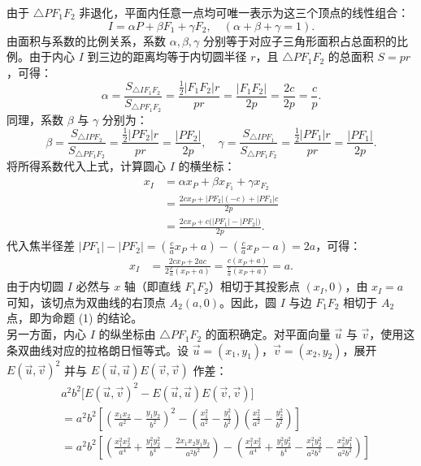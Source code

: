 \begin{solution}
由于 $\triangle PF_1F_2$ 非退化，平面内任意一点均可唯一表示为这三个顶点的线性组合：
\[ I = \alpha P + \beta F_1 + \gamma F_2, \quad (\alpha + \beta + \gamma = 1). \]
由面积与系数的比例关系，系数 $\alpha, \beta, \gamma$ 分别等于对应子三角形面积占总面积的比例。由于内心 $I$ 到三边的距离均等于内切圆半径 $r$，且 $\triangle PF_1F_2$ 的总面积 $S = p r$，可得：
\[ \alpha = \frac{S_{\triangle IF_1F_2}}{S_{\triangle PF_1F_2}} = \frac{\frac{1}{2} |F_1F_2| r}{p r} = \frac{|F_1F_2|}{2p} = \frac{2c}{2p} = \frac{c}{p}. \]
同理，系数 $\beta$ 与 $\gamma$ 分别为：
\[ \beta = \frac{S_{\triangle IPF_2}}{S_{\triangle PF_1F_2}} = \frac{\frac{1}{2} |PF_2| r}{p r} = \frac{|PF_2|}{2p}, \quad \gamma = \frac{S_{\triangle IPF_1}}{S_{\triangle PF_1F_2}} = \frac{\frac{1}{2} |PF_1| r}{p r} = \frac{|PF_1|}{2p}. \]
将所得系数代入上式，计算圆心 $I$ 的横坐标：
\begin{align*}
x_I &= \alpha x_P + \beta x_{F_1} + \gamma x_{F_2} \\
&= \frac{2c x_P + |PF_2| (-c) + |PF_1| c}{2p} \\
&= \frac{2c x_P + c \big( |PF_1| - |PF_2| \big)}{2p}.
\end{align*}
代入焦半径差 $|PF_1| - |PF_2| = \left( \frac{c}{a} x_P + a \right) - \left( \frac{c}{a} x_P - a \right) = 2a$，可得：
\begin{align*}
x_I &= \frac{2c x_P + 2ac}{2 \frac{c}{a} (x_P + a)} = \frac{c(x_P + a)}{\frac{c}{a}(x_P + a)} = a.
\end{align*}
由于内切圆 $I$ 必然与 $x$ 轴（即直线 $F_1F_2$）相切于其投影点 $(x_I, 0)$，由 $x_I = a$ 可知，该切点为双曲线的右顶点 $A_2(a, 0)$。因此，圆 $I$ 与边 $F_1F_2$ 相切于 $A_2$ 点，即为命题 (1) 的结论。\\
另一方面，内心 $I$ 的纵坐标由 $\triangle PF_1F_2$ 的面积确定。对平面向量 $\vec{u}$ 与 $\vec{v}$，使用这条双曲线对应的拉格朗日恒等式。设 $\vec{u} = (x_1, y_1)$，$\vec{v} = (x_2, y_2)$，展开 $E(\vec{u}, \vec{v})^2$ 并与 $E(\vec{u}, \vec{u})E(\vec{v}, \vec{v})$ 作差：
\begin{align*}
&a^2b^2 \big[ E(\vec{u}, \vec{v})^2 - E(\vec{u}, \vec{u}) E(\vec{v}, \vec{v}) \big] \\
&= a^2b^2 \left[ \left( \frac{x_1 x_2}{a^2} - \frac{y_1 y_2}{b^2} \right)^2 - \left( \frac{x_1^2}{a^2} - \frac{y_1^2}{b^2} \right)\left( \frac{x_2^2}{a^2} - \frac{y_2^2}{b^2} \right) \right] \\
&= a^2b^2 \left[ \left( \frac{x_1^2 x_2^2}{a^4} + \frac{y_1^2 y_2^2}{b^4} - \frac{2x_1 x_2 y_1 y_2}{a^2 b^2} \right) - \left( \frac{x_1^2 x_2^2}{a^4} + \frac{y_1^2 y_2^2}{b^4} - \frac{x_1^2 y_2^2}{a^2 b^2} - \frac{x_2^2 y_1^2}{a^2 b^2} \right) \right] \\

\end{align*}
\end{solution}
